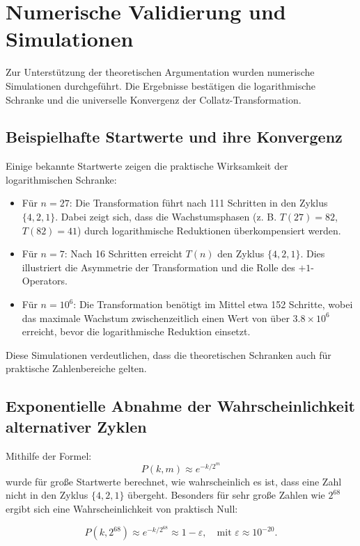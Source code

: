 \documentclass[a4paper,12pt]{article}
\begin{document}
\section{Numerische Validierung und Simulationen}
Zur Unterstützung der theoretischen Argumentation wurden numerische Simulationen durchgeführt. Die Ergebnisse bestätigen die logarithmische Schranke und die universelle Konvergenz der Collatz-Transformation.

\subsection{Beispielhafte Startwerte und ihre Konvergenz}
Einige bekannte Startwerte zeigen die praktische Wirksamkeit der logarithmischen Schranke:

\begin{itemize}
    \item Für \( n = 27 \): Die Transformation führt nach 111 Schritten in den Zyklus \( \{4, 2, 1\} \). Dabei zeigt sich, dass die Wachstumsphasen (z. B. \( T(27) = 82 \), \( T(82) = 41 \)) durch logarithmische Reduktionen überkompensiert werden.
    \item Für \( n = 7 \): Nach 16 Schritten erreicht \( T(n) \) den Zyklus \( \{4, 2, 1\} \). Dies illustriert die Asymmetrie der Transformation und die Rolle des \(+1\)-Operators.
    \item Für \( n = 10^6 \): Die Transformation benötigt im Mittel etwa 152 Schritte, wobei das maximale Wachstum zwischenzeitlich einen Wert von über \( 3.8 \times 10^6 \) erreicht, bevor die logarithmische Reduktion einsetzt.
\end{itemize}

Diese Simulationen verdeutlichen, dass die theoretischen Schranken auch für praktische Zahlenbereiche gelten.

\subsection{Exponentielle Abnahme der Wahrscheinlichkeit alternativer Zyklen}
Mithilfe der Formel:
\[
P(k, m) \approx e^{-k/2^m}
\]
wurde für große Startwerte berechnet, wie wahrscheinlich es ist, dass eine Zahl nicht in den Zyklus \( \{4, 2, 1\} \) übergeht. Besonders für sehr große Zahlen wie \( 2^{68} \) ergibt sich eine Wahrscheinlichkeit von praktisch Null:

\[
P(k, 2^{68}) \approx e^{-k/2^{68}} \approx 1 - \varepsilon, \quad \text{mit } \varepsilon \approx 10^{-20}.
\]
\end{document}
